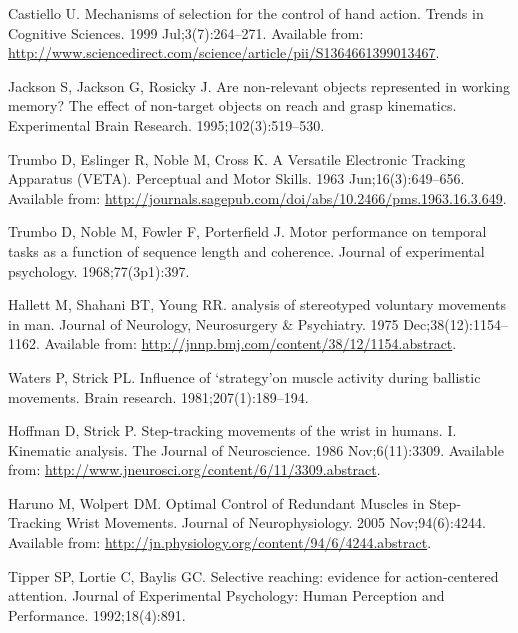 \documentclass[10pt,letterpaper]{article}
\begin{document}
\begin{thebibliography}{10}
Castiello U.
\newblock Mechanisms of selection for the control of hand action.
\newblock Trends in Cognitive Sciences. 1999 Jul;3(7):264--271.
\newblock Available from:
  \url{http://www.sciencedirect.com/science/article/pii/S1364661399013467}.

Jackson S, Jackson G, Rosicky J.
\newblock Are non-relevant objects represented in working memory? {The} effect
  of non-target objects on reach and grasp kinematics.
\newblock Experimental Brain Research. 1995;102(3):519--530.

Trumbo D, Eslinger R, Noble M, Cross K.
\newblock A {Versatile} {Electronic} {Tracking} {Apparatus} ({VETA}).
\newblock Perceptual and Motor Skills. 1963 Jun;16(3):649--656.
\newblock Available from:
  \url{http://journals.sagepub.com/doi/abs/10.2466/pms.1963.16.3.649}.

Trumbo D, Noble M, Fowler F, Porterfield J.
\newblock Motor performance on temporal tasks as a function of sequence length
  and coherence.
\newblock Journal of experimental psychology. 1968;77(3p1):397.

Hallett M, Shahani BT, Young RR.
 analysis of stereotyped voluntary movements in man.
\newblock Journal of Neurology, Neurosurgery \& Psychiatry. 1975
  Dec;38(12):1154--1162.
\newblock Available from:
  \url{http://jnnp.bmj.com/content/38/12/1154.abstract}.

Waters P, Strick PL.
\newblock Influence of ‘strategy’on muscle activity during ballistic
  movements.
\newblock Brain research. 1981;207(1):189--194.

Hoffman D, Strick P.
\newblock Step-tracking movements of the wrist in humans. {I}. {Kinematic}
  analysis.
\newblock The Journal of Neuroscience. 1986 Nov;6(11):3309.
\newblock Available from:
  \url{http://www.jneurosci.org/content/6/11/3309.abstract}.

Haruno M, Wolpert DM.
\newblock Optimal {Control} of {Redundant} {Muscles} in {Step}-{Tracking}
  {Wrist} {Movements}.
\newblock Journal of Neurophysiology. 2005 Nov;94(6):4244.
\newblock Available from:
  \url{http://jn.physiology.org/content/94/6/4244.abstract}.

Tipper SP, Lortie C, Baylis GC.
\newblock Selective reaching: evidence for action-centered attention.
\newblock Journal of Experimental Psychology: Human Perception and Performance.
  1992;18(4):891.


\end{thebibliography}
\end{document}
